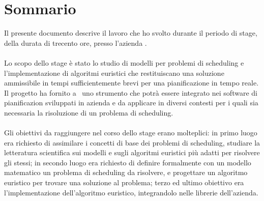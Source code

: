 
\cleardoublepage
{}
{}
\begingroup
\let\clearpage\relax
\let\cleardoublepage\relax
\let\cleardoublepage\relax

\chapter*{Sommario}

Il presente documento descrive il lavoro che ho svolto durante il periodo di stage, della durata di trecento ore, presso l'azienda \TS. \\ \\
Lo scopo dello stage è stato lo studio di modelli per problemi di scheduling e l'implementazione di algoritmi euristici che restituiscano una soluzione ammissibile in tempi sufficientemente brevi per una pianificazione in tempo reale. Il progetto ha fornito a \TS\ uno strumento che potrà essere integrato nei software di pianificazion sviluppati in azienda e da applicare in diversi contesti per i quali sia necessaria la risoluzione di un problema di scheduling. \\ \\
Gli obiettivi da raggiungere nel corso dello stage erano molteplici: 
in primo luogo era richiesto di assimilare i concetti di base dei problemi di scheduling, studiare la letteratura scientifica sui modelli e sugli algoritmi euristici più adatti per risolvere gli stessi; in secondo luogo era richiesto di definire formalmente con un modello matematico un problema di scheduling da risolvere, e progettare un algoritmo euristico per trovare una soluzione al problema; terzo ed ultimo obiettivo era l'implementazione dell'algoritmo euristico, integrandolo nelle librerie dell'azienda.

\endgroup			

\vfill

